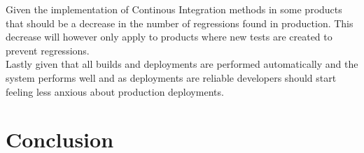 \documentclass{ituthesis}
\begin{document}
Given the implementation of Continous Integration methods in some products that should be a decrease in the number of regressions found in production. This decrease will however only apply to products where new tests are created to prevent regressions.\\

Lastly given that all builds and deployments are performed automatically and the system performs well and as deployments are reliable developers should start feeling less anxious about production deployments.

\chapter{Conclusion}
\label{ch:conclusion}

\clearpage

\nocite{Humble2010}
\nocite{Bellomo2014}
\nocite{beck2001agile}

\end{document}
